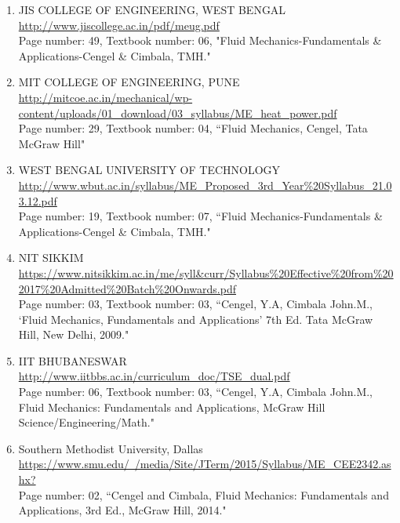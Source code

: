 \documentclass[a4paper, 10 pt]{article}
\begin{document}
\begin{enumerate}
    \item JIS COLLEGE OF ENGINEERING, WEST BENGAL\\ \href{http://www.jiscollege.ac.in/pdf/meug.pdf}{http://www.jiscollege.ac.in/pdf/meug.pdf}\\Page number: 49, Textbook number: 06, "Fluid Mechanics-Fundamentals \& Applications-Cengel \& Cimbala, TMH."
    
    \item MIT COLLEGE OF ENGINEERING, PUNE\\ \href{http://mitcoe.ac.in/mechanical/wp-content/uploads/01\_download/03\_syllabus/ME\_heat\_power.pdf}{http://mitcoe.ac.in/mechanical/wp-content/uploads/01\_download/03\_syllabus/ME\_heat\_power.pdf}\\Page number: 29, Textbook number: 04, ``Fluid Mechanics, Cengel, Tata McGraw Hill"
    
    \item WEST BENGAL UNIVERSITY OF TECHNOLOGY\\ \href{http://www.wbut.ac.in/syllabus/ME\_Proposed\_3rd\_Year\%20Syllabus\_21.03.12.pdf}{http://www.wbut.ac.in/syllabus/ME\_Proposed\_3rd\_Year\%20Syllabus\_21.03.12.pdf}\\Page number: 19, Textbook number: 07, ``Fluid Mechanics-Fundamentals \& Applications-Cengel \& Cimbala, TMH."
    
    \item NIT SIKKIM\\ \url{https://www.nitsikkim.ac.in/me/syll\&curr/Syllabus\%20Effective\%20from\%202017\%20Admitted\%20Batch\%20Onwards.pdf}\\ Page number: 03, Textbook number: 03, ``Cengel, Y.A, Cimbala John.M., `Fluid Mechanics, Fundamentals and Applications' 7th Ed. Tata McGraw Hill, New Delhi, 2009."

    \item IIT BHUBANESWAR\\ \href{http://www.iitbbs.ac.in/curriculum\_doc/TSE\_dual.pdf}{http://www.iitbbs.ac.in/curriculum\_doc/TSE\_dual.pdf}\\Page number: 06, Textbook number: 03, ``Cengel, Y.A, Cimbala John.M., Fluid Mechanics: Fundamentals and Applications, McGraw Hill Science/Engineering/Math."

    \item Southern Methodist University, Dallas\\ \href{https://www.smu.edu/~/media/Site/JTerm/2015/Syllabus/ME\_CEE2342.ashx?}{https://www.smu.edu/~/media/Site/JTerm/2015/Syllabus/ME\_CEE2342.ashx?}\\Page number: 02, ``Cengel and Cimbala, Fluid Mechanics: Fundamentals and Applications, 3rd Ed., McGraw Hill, 2014."

\end{enumerate}
\end{document}
